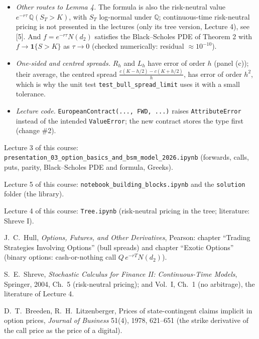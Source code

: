 \documentclass[11pt,a4paper]{article}
\newcommand{\subhead}[1]{\par\medskip\noindent{\large\bfseries #1}\par\smallskip\noindent\ignorespaces}
\newcommand{\Q}{\mathbb{Q}}
\newcommand{\ind}{\mathbf{1}}
\renewcommand{\subhead}[1]{\par\medskip\needspace{8\baselineskip}\noindent{\large\bfseries #1}\par\smallskip\noindent\ignorespaces}
\begin{document}
\subhead{Comment (to keep in mind).}
\begin{itemize}
\item \emph{Other routes to Lemma 4.} The formula is also the risk-neutral value $e^{-r\tau}\,\Q(S_T>K)$, with $S_T$ log-normal under $\Q$; continuous-time risk-neutral pricing is not presented in the lectures (only its tree version, Lecture 4), see [5]. And $f=e^{-r\tau}N(d_2)$ satisfies the Black--Scholes PDE of Theorem 2 with $f\to\ind\{S>K\}$ as $\tau\to0$ (checked numerically: residual $\approx10^{-10}$).
\item \emph{One-sided and centred spreads.} $R_h$ and $L_h$ have error of order $h$ (panel (c)); their average, the centred spread $\frac{c(K-h/2)-c(K+h/2)}{h}$, has error of order $h^2$, which is why the unit test \texttt{test\_bull\_spread\_limit} uses it with a small tolerance.
\item \emph{Lecture code.} \texttt{EuropeanContract(..., FWD, ...)} raises \texttt{AttributeError} instead of the intended \texttt{ValueError}; the new contract stores the type first (change \#2).
\end{itemize}

\subhead{References.}
\begin{enumerate}[label={[\arabic*]}]
\item Lecture 3 of this course: \texttt{presentation\_03\_option\_basics\_and\_bsm\_model\_2026.ipynb} (forwards, calls, puts, parity, Black--Scholes PDE and formula, Greeks).
\item Lecture 5 of this course: \texttt{notebook\_building\_blocks.ipynb} and the \texttt{solution} folder (the library).
\item Lecture 4 of this course: \texttt{Tree.ipynb} (risk-neutral pricing in the tree; literature: Shreve I).
\item J.~C.~Hull, \emph{Options, Futures, and Other Derivatives}, Pearson: chapter ``Trading Strategies Involving Options'' (bull spreads) and chapter ``Exotic Options'' (binary options: cash-or-nothing call $Q\,e^{-rT}N(d_2)$).
\item S.~E.~Shreve, \emph{Stochastic Calculus for Finance II: Continuous-Time Models}, Springer, 2004, Ch.~5 (risk-neutral pricing); and Vol.~I, Ch.~1 (no arbitrage), the literature of Lecture 4.
\item D.~T.~Breeden, R.~H.~Litzenberger, Prices of state-contingent claims implicit in option prices, \emph{Journal of Business} 51(4), 1978, 621--651 (the strike derivative of the call price as the price of a digital).
\end{enumerate}
\end{document}
